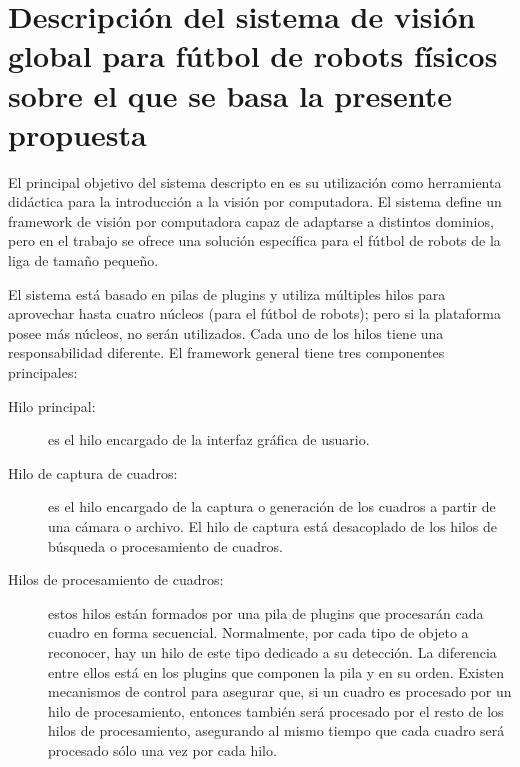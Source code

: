 
\section{Descripción del sistema de visión global para fútbol de robots físicos
sobre el que se basa la presente propuesta}


El principal objetivo del sistema descripto en \cite{torres2014} es su
utilización como herramienta didáctica para la introducción a la visión por
computadora. El sistema define un framework de visión por computadora capaz de
adaptarse a distintos dominios, pero en el trabajo se ofrece una solución
específica para el fútbol de robots de la liga de tamaño pequeño.

El sistema está basado en pilas de plugins y utiliza múltiples hilos para
aprovechar hasta cuatro núcleos (para el fútbol de robots); pero si la
plataforma posee más núcleos, no serán utilizados. Cada uno de los hilos tiene
una responsabilidad diferente. El framework general tiene tres componentes
principales:

\begin{description}

	\item[Hilo principal:] es el hilo encargado de la interfaz gráfica de
		usuario.

	\item[Hilo de captura de cuadros:] es el hilo encargado de la captura o
		generación de los cuadros a partir de una cámara o archivo. El
		hilo de captura está desacoplado de los hilos de búsqueda o
		procesamiento de cuadros.

	\item[Hilos de procesamiento de cuadros:] estos hilos están formados por
		una pila de plugins que procesarán cada cuadro en forma
		secuencial. Normalmente, por cada tipo de objeto a reconocer,
		hay un hilo de este tipo dedicado a su detección. La diferencia
		entre ellos está en los plugins que componen la pila y en su
		orden. Existen mecanismos de control para asegurar que, si un
		cuadro es procesado por un hilo de procesamiento, entonces
		también será procesado por el resto de los hilos de
		procesamiento, asegurando al mismo tiempo que cada cuadro será
		procesado sólo una vez por cada hilo.

\end{description}

